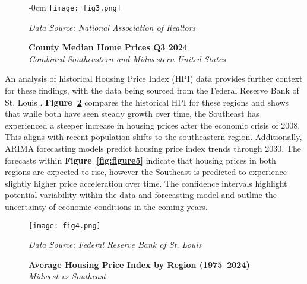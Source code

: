 \documentclass[journal,article,submit,pdftex,moreauthors]{Definitions/mdpi}
\begin{document}
\begin{comment}
\textcolor{red}{
\textbf{Figure~\ref{fig:figure3}} provides a combined view of the two regions, further emphasizing regional differences on one plot. The affordability of housing remains notably higher in the Midwest compared to the Southeast. This aligns within broader trends in regional growth patterns, where the Southeast has experienced greater population inflow and growth than the Midwest. These trends are later explored further within this research, and can be viewed within \textbf{Figure~\ref{fig:figure13}}, \textbf{Figure~\ref{fig:figure14}}, and \textbf{Figure~\ref{fig:figure15}}.
}
\end{comment}

\begin{figure}[H]
  \begin{adjustwidth}{-\extralength}{0cm}
    \centering
    \texttt{[image: fig3.png]}
    \caption{\textbf{County Median Home Prices Q3 2024}\\\textit{Combined Southeastern and Midwestern United States}}
    \label{fig:figure3}
    \vspace{1ex}
    {\footnotesize\textit{Data Source: National Association of Realtors}}
  \end{adjustwidth}
\end{figure}

\vspace{5cm}

An analysis of historical Housing Price Index (HPI) data provides further context for these findings, with the data being sourced from the Federal Reserve Bank of St. Louis \citep{a2024_hpi}. \textbf{Figure~\ref{fig:figure4}} compares the historical HPI for these regions and shows that while both have seen steady growth over time, the Southeast has experienced a steeper increase in housing prices after the economic crisis of 2008. This aligns with recent population shifts to the southeastern region. Additionally, ARIMA forecasting models predict housing price index trends through 2030. The forecasts within \textbf{Figure~\ref{fig:figure5}} indicate that housing prices in both regions are expected to rise, however the Southeast is predicted to experience slightly higher price acceleration over time. The confidence intervals highlight potential variability within the data and forecasting model and outline the uncertainty of economic conditions in the coming years.

\begin{figure}[H]
  \centering
  \texttt{[image: fig4.png]}
  \caption{\textbf{Average Housing Price Index by Region (1975–2024)}\\\textit{Midwest vs Southeast}}
  \label{fig:figure4}
  \vspace{1ex}
  {\footnotesize\textit{Data Source: Federal Reserve Bank of St. Louis}}
\end{figure}
\end{document}

